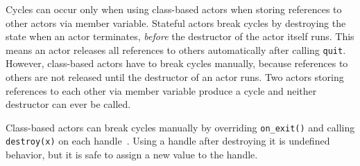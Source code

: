 Cycles can occur only when using class-based actors when storing references to
other actors via member variable. Stateful actors  break
cycles by destroying the state when an actor terminates, \emph{before} the
destructor of the actor itself runs. This means an actor releases all
references to others automatically after calling \lstinline^quit^. However,
class-based actors have to break cycles manually, because references to others
are not released until the destructor of an actor runs. Two actors storing
references to each other via member variable produce a cycle and neither
destructor can ever be called.

Class-based actors can break cycles manually by overriding
\lstinline^on_exit()^ and calling \lstinline^destroy(x)^ on each
handle~. Using a handle after destroying it is undefined
behavior, but it is safe to assign a new value to the handle.

